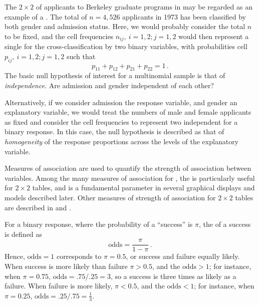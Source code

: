 \documentclass[10pt,krantz2]{krantz}\usepackage[]{graphicx}\usepackage[]{color}
\begin{document}
The $2 \times 2$ \ctab of applicants to Berkeley graduate programs in  may be regarded as an example of a
.
The total of $n = 4,526$ applicants in 1973 has been classified by both
gender and admission status.
Here, we would probably consider the total $n$ to be fixed,
and the cell frequencies $n_{ij},  \: i=1,2; j=1,2$
would then represent a single
 for the cross-classification by two
binary variables,
with probabilities cell $p_{ij},  \: i=1,2; j=1,2$
such that
\begin{equation*}
 p_{11} + p_{12} + p_{21} + p_{22} = 1
 \period
\end{equation*}
The basic null hypothesis of interest for a multinomial sample is that
of \emph{independence}.  Are admission and gender independent of each other?

Alternatively, if we consider admission the response variable, and
gender an explanatory variable, we would treat the numbers of male
and female applicants as fixed
and consider the cell frequencies to represent two independent
 for a binary response.
In this case, the null hypothesis is described as that of \emph{homogeneity}
of the response proportions across the levels of the explanatory variable.

Measures of association are used to quantify the strength of association
between variables.  Among the many measures of association for
\ctabs, the  is particularly useful for
$2 \times 2$ tables, and is a fundamental parameter in several
graphical displays and models described later.
Other measures of strength of association for $2 \times 2$ tables
are described in \citet[]{Stokes-etal:00} and \citet[\S 2.2]{Agresti:96}.

For a binary response, where the probability of a ``success'' is $\pi$,
the  of a success is defined as
\begin{equation*}
 \textrm{odds} = \frac{\pi}{1-\pi} \period
\end{equation*}
Hence, $\textrm{odds} = 1$ corresponds to $\pi = 0.5$, or success and
failure equally likely.   When success is more likely than failure
$\pi > 0.5$, and the $\textrm{odds} > 1$;  for instance, when $\pi = 0.75$,
$\textrm{odds} = .75/.25 =3$, so a success is three times as likely
as a failure.  When failure is more likely, $\pi < 0.5$, and the $\textrm{odds} < 1$;  for instance, when $\pi = 0.25$,
$\textrm{odds} = .25/.75 =\frac{1}{3}$.
\end{document}
